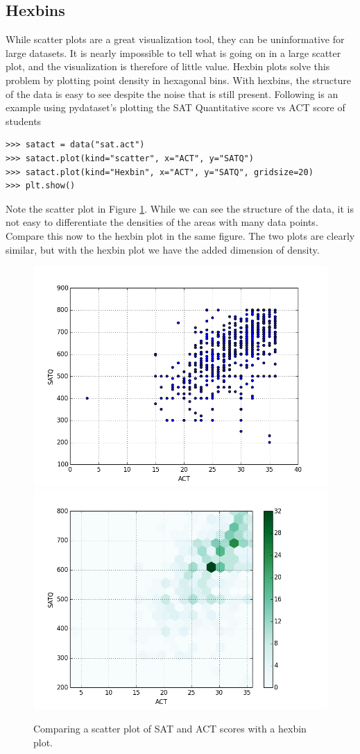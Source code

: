 \subsection*{Hexbins}
While scatter plots are a great visualization tool, they can be uninformative for large datasets.  It is nearly impossible to tell what is going on in a large scatter plot, and the visualization is therefore of little value.  Hexbin plots solve this problem by plotting point density in hexagonal bins.  With hexbins, the structure of the data is easy to see despite the noise that is still present.
Following is an example using pydataset's  plotting the SAT Quantitative score vs ACT score of students


\begin{lstlisting}
>>> satact = data("sat.act")
>>> satact.plot(kind="scatter", x="ACT", y="SATQ")
>>> satact.plot(kind="Hexbin", x="ACT", y="SATQ", gridsize=20)
>>> plt.show()
\end{lstlisting}

Note the scatter plot in Figure \ref{fig:comp}. While we can see the structure of the data, it is not easy to differentiate the densities of the areas with many data points. Compare this now to the hexbin plot in the same figure.  The two plots are clearly similar, but with the hexbin plot we have the added dimension of density.
\begin{figure}[H]
    \centering
    \includegraphics[width=.49\textwidth]{scatter.png}
    \includegraphics[width=.49\textwidth]{hexbin2.png}
    \caption{Comparing a scatter plot of SAT and ACT scores with a hexbin plot.}
    \label{fig:comp}
\end{figure}

